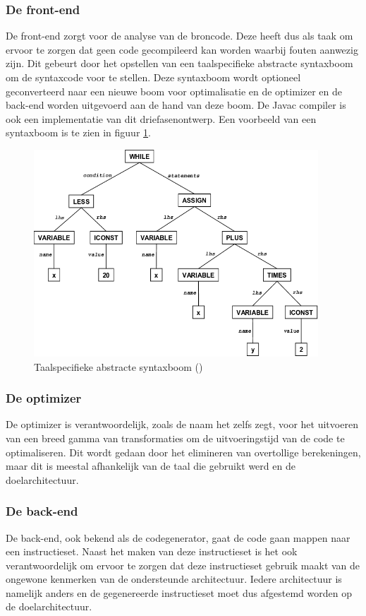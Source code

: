 \subsubsection{De front-end}
De front-end zorgt voor de analyse van de broncode. Deze heeft dus als taak om ervoor te zorgen dat geen code gecompileerd kan worden waarbij fouten aanwezig zijn. Dit gebeurt door het opstellen van een taalspecifieke abstracte syntaxboom om de syntaxcode voor te stellen. Deze syntaxboom wordt optioneel geconverteerd naar een nieuwe boom voor optimalisatie en de optimizer en de back-end worden uitgevoerd aan de hand van deze boom. De Javac compiler is ook een implementatie van dit driefasenontwerp. Een voorbeeld van een syntaxboom is te zien in figuur \ref{fig:syntaxtree}.

\begin{figure} [ht]
	\centering
	\includegraphics[width=0.95\textwidth]{img/syntaxtree.png}
	\caption{Taalspecifieke abstracte syntaxboom (\cite{ResearchGate})}
	\label{fig:syntaxtree}
\end{figure}

\subsubsection{De optimizer}
De optimizer is verantwoordelijk, zoals de naam het zelfs zegt, voor het uitvoeren van een breed gamma van transformaties om de uitvoeringstijd van de code te optimaliseren. Dit wordt gedaan door het elimineren van overtollige berekeningen, maar dit is meestal afhankelijk van de taal die gebruikt werd en de doelarchitectuur.

\subsubsection{De back-end}
De back-end, ook bekend als de codegenerator, gaat de code gaan mappen naar een instructieset. Naast het maken van deze instructieset is het ook verantwoordelijk om ervoor te zorgen dat deze instructieset gebruik maakt van de ongewone kenmerken van de ondersteunde architectuur. Iedere architectuur is namelijk anders en de gegenereerde instructieset moet dus afgestemd worden op de doelarchitectuur.

